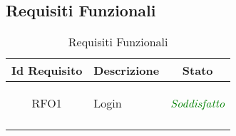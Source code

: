 \subsection{Requisiti Funzionali}
\normalsize
\begin{longtable}{|c|>{\centering}m{7cm}|c|}
\hline 
\textbf{Id Requisito} & \textbf{Descrizione} & \textbf{Stato}\\
\hline
\endhead
\hypertarget{RFO1}{RFO1} & Login & \textcolor{Green}{\textit{Soddisfatto}}\\ \hline

\caption[Requisiti Funzionali]{Requisiti Funzionali}
\label{tabella:req0}
\end{longtable}
\clearpage

